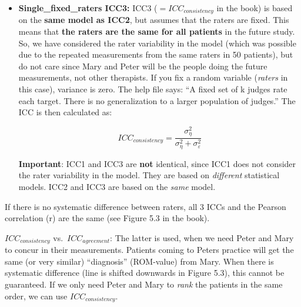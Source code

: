\documentclass[
]{book}
\begin{document}
\begin{itemize}
  \[ICC_{agreement} = \frac{\sigma_{\eta}^2}{\sigma_{\eta}^2 +\mathbf{\sigma_{rater}^2} + \sigma_{\varepsilon}^2}\]
\item
  \textbf{Single\_fixed\_raters ICC3:}
  ICC3 (\(=ICC_{consistency}\) in the book) is based on the \textbf{same model as ICC2},
  but assumes that the raters are fixed.
  This means that \textbf{the raters are the same for all patients} in the future study.
  So, we have considered the rater variability in the model
  (which was possible due to the repeated measurements from the same raters in 50 patients),
  but do not care since Mary and Peter will be the people doing the future
  measurements, not other therapists. If you fix a random variable
  (\emph{raters} in this case), variance is zero. The help file says:
  ``A fixed set of k judges rate each target.
  There is no generalization to a larger population of judges.''
  The ICC is then calculated as:

  \[ICC_{consistency} = \frac{\sigma_{\eta}^2}{\sigma_{\eta}^2 + \sigma_{\varepsilon}^2}\]

  \textbf{Important}: ICC1 and ICC3 are \textbf{not} identical, since ICC1 does not consider the rater variability
  in the model. They are based on \emph{different} statistical models.
  ICC2 and ICC3 are based on the \emph{same} model.
\end{itemize}

If there is no systematic difference between raters, all 3 ICCs and the Pearson
correlation (r) are the same (see Figure 5.3 in the book).

\(ICC_{consistency}\) vs.~\(ICC_{agreement}\):
The latter is used, when we need Peter and Mary to concur in their measurements.
Patients coming to Peters practice will get the same (or very similar) ``diagnosis'' (ROM-value)
from Mary. When there is systematic difference (line is shifted downwards in Figure 5.3),
this cannot be guaranteed.
If we only need Peter and Mary to \emph{rank} the patients in the same order,
we can use \(ICC_{consistency}\).
\end{document}
